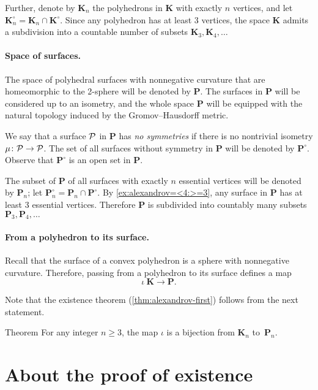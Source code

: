 Further, denote by $\bm{K}_n$ the polyhedrons in $\bm{K}$ with exactly $n$ vertices, and let $\bm{K}_n^\circ=\bm{K}_n\cap \bm{K}^\circ$.
Since any polyhedron has at least 3 vertices, the space $\bm{K}$ admits a subdivision into a countable number of subsets $\bm{K}_3,\bm{K}_4,\dots$

\paragraph{Space of surfaces.}
The space of polyhedral surfaces with nonnegative curvature that are homeomorphic to the 2-sphere will be denoted by $\bm{P}$.
The surfaces in $\bm{P}$ will be considered up to an isometry, and the whole space $\bm{P}$ will be equipped with the natural topology induced by the Gromov--Hausdorff metric.

We say that a surface $\mathcal{P}$ in $\bm{P}$ has \emph{no symmetries} if there is no nontrivial isometry
$\mu\colon\mathcal{P}\to \mathcal{P}$.
The set of all surfaces without symmetry in $\bm{P}$ will be denoted by $\bm{P}^\circ$.
Observe that $\bm{P}^\circ$ is an open set in $\bm{P}$.

The subset of $\bm{P}$ of all surfaces with exactly $n$ essential vertices will be denoted by $\bm{P}_n$; let $\bm{P}_n^\circ=\bm{P}_n\cap \bm{P}^\circ$.
By \ref{ex:alexandrov=<4:>=3}, any surface in $\bm{P}$ has at least 3 essential vertices.
Therefore $\bm{P}$ is subdivided into countably many subsets
 $\bm{P}_3,\bm{P}_4,\dots$

\paragraph{From a polyhedron to its surface.}
Recall that the surface of a convex polyhedron is a sphere with nonnegative curvature.
Therefore, passing from a polyhedron to its surface defines a map
\[\iota\:\bm{K}\to \bm{P}.\]

Note that the existence theorem (\ref{thm:alexandrov-first}) follows from the next statement.

\begin{thm}{Theorem}\label{thm:reformulation}
For any integer $n\ge 3$,
the map $\iota$ is a bijection from $\bm{K}_n$ to~$\bm{P}_n$.
\end{thm}

\section{About the proof of existence}


